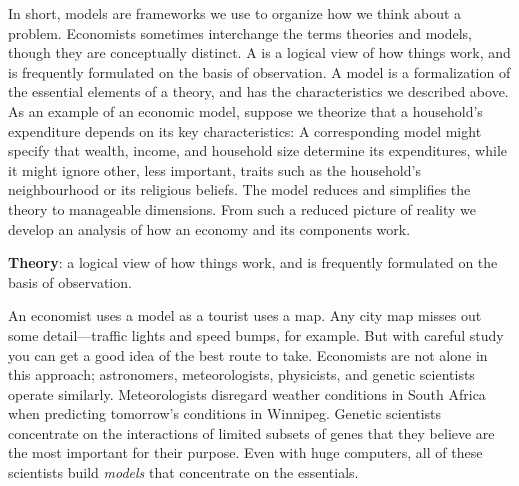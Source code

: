 \newhtmlpage

In short, models are frameworks we use to organize how we think about a
problem. Economists sometimes interchange the terms theories and models,
though they are conceptually distinct. A  is a logical
view of how things work, and is frequently formulated on the basis of
observation. A model is a formalization of the essential elements of a
theory, and has the characteristics we described above. As an example of an
economic model, suppose we theorize that a household's expenditure depends
on its key characteristics: A corresponding model might specify that wealth,
income, and household size determine its expenditures, while it might ignore
other, less important, traits such as the household's neighbourhood or its
religious beliefs. The model reduces and simplifies the theory to manageable
dimensions. From such a reduced picture of reality we develop an analysis of
how an economy and its components work.

\begin{DefBox}
	\textbf{Theory}: a logical view of how things work, and is frequently formulated on the basis of observation.  
\end{DefBox}

An economist uses a model as a tourist uses a map. Any city map misses out
some detail---traffic lights and speed bumps, for example. But with careful
study you can get a good idea of the best route to take. Economists are not
alone in this approach; astronomers, meteorologists, physicists, and genetic
scientists operate similarly. Meteorologists disregard weather conditions in
South Africa when predicting tomorrow's conditions in Winnipeg. Genetic
scientists concentrate on the interactions of limited subsets of genes that
they believe are the most important for their purpose. Even with huge
computers, all of these scientists build \textit{models} that concentrate on
the essentials.